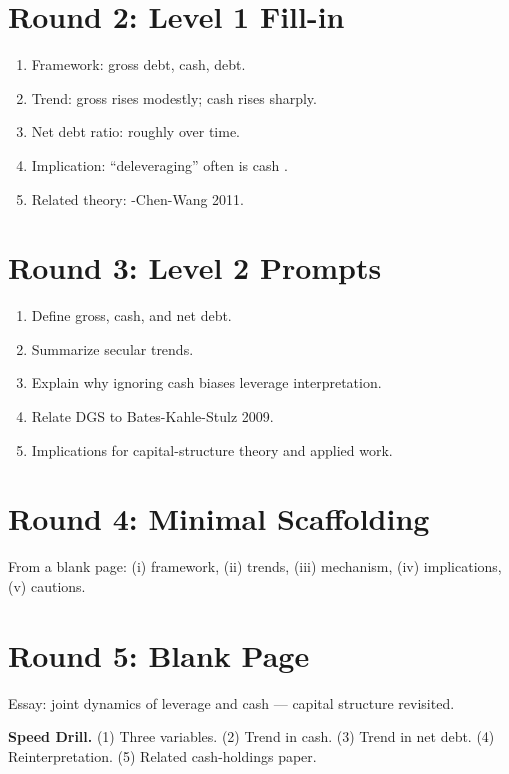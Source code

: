\documentclass[11pt]{article}
\newcommand{\blank}[1]{\underline{\hspace{#1}}}
\begin{document}
\section*{Round 2: Level 1 Fill-in}
\begin{enumerate}
\item Framework: gross debt, cash, \blank{2cm} debt.
\item Trend: gross \blank{2cm} rises modestly; cash rises sharply.
\item Net debt ratio: roughly \blank{2cm} over time.
\item Implication: ``deleveraging'' often is cash \blank{2cm}.
\item Related theory: \blank{2cm}-Chen-Wang 2011.
\end{enumerate}

\section*{Round 3: Level 2 Prompts}
\begin{enumerate}
\item Define gross, cash, and net debt.
\item Summarize secular trends.
\item Explain why ignoring cash biases leverage interpretation.
\item Relate DGS to Bates-Kahle-Stulz 2009.
\item Implications for capital-structure theory and applied work.
\end{enumerate}

\section*{Round 4: Minimal Scaffolding}
From a blank page: (i) framework, (ii) trends, (iii) mechanism, (iv) implications, (v) cautions.

\section*{Round 5: Blank Page}
Essay: joint dynamics of leverage and cash --- capital structure revisited.

\vspace{6pt}
\begin{drillbox}
\textbf{Speed Drill.} (1) Three variables. (2) Trend in cash. (3) Trend in net debt. (4) Reinterpretation. (5) Related cash-holdings paper.
\end{drillbox}
\end{document}
